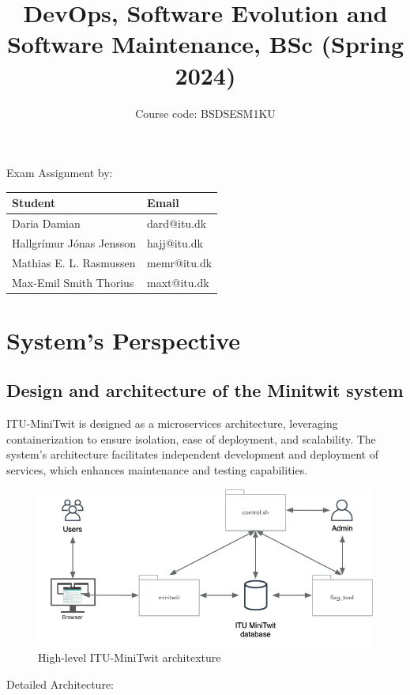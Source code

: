 \documentclass[12pt, a4paper, oneside]{book}
\title{DevOps, Software Evolution and Software Maintenance, BSc (Spring 2024)}
\author{Course code: BSDSESM1KU}
\begin{document}
\begin{spacing}{1.5}

\begin{minipage}{\textwidth}
\maketitle

\begin{center}
    Exam Assignment by: \\
    \hfill \break
    \bgroup
    \def\arraystretch{1.5}%
    \begin{tabularx}{0.8\textwidth} { 
      | >{\centering\arraybackslash}X 
      | >{\centering\arraybackslash}X | }
     \hline
     \cellcolor[HTML]{EFEFEF} Student & \cellcolor[HTML]{EFEFEF} Email \\
     \hline
     Daria Damian & dard@itu.dk \\
     \hline
     Hallgrímur Jónas Jensson & hajj@itu.dk \\
    \hline
     Mathias E. L. Rasmussen & memr@itu.dk \\
    \hline
     Max-Emil Smith Thorius & maxt@itu.dk \\
    \hline
    \end{tabularx}
    \egroup
\end{center}
\end{minipage}

\tableofcontents

\chapter{System's Perspective}

\section{Design and architecture of the Minitwit system}


ITU-MiniTwit is designed as a microservices architecture, leveraging containerization to ensure isolation, ease of deployment, and scalability. The system's architecture facilitates independent development and deployment of services, which enhances maintenance and testing capabilities.
\begin{figure}[h]
    \centering
    \includegraphics[width=\textwidth]{images/ITU-minitwit-architecture.png}
    \caption{High-level ITU-MiniTwit architexture}
\end{figure}
Detailed Architecture:


\end{spacing}
\end{document}
